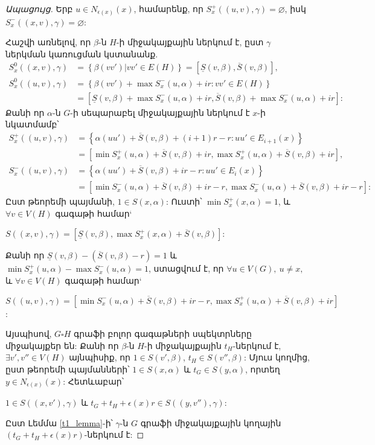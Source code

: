 \begin{proof}[Ապացույց]
Երբ $u\in N_{\epsilon(x)}(x)$, համարենք, որ $S_x^+((u,v),\gamma)=\varnothing$, իսկ $S_x^-((x,v),\gamma)=\varnothing$:

Հաշվի առնելով, որ $\beta$-ն $H$-ի միջակայքային ներկում է, ըստ $\gamma$ ներկման կառուցման կստանանք.
\begin{align*}
S_x^0((x,v),\gamma) &= \left\{ \beta(vv') | vv'\in E(H) \right\} = [\underline{S}(v,\beta),\overline{S}(v,\beta)],\\
S_x^0((u,v),\gamma) &= \left\{ \beta(vv') + \max{S_x^-(u,\alpha)} + i r : vv'\in E(H) \right\}\\
					&= [\underline{S}(v,\beta) + \max{S_x^-(u,\alpha)} + i r ,\overline{S}(v,\beta) + \max{S_x^-(u,\alpha)} + i r ]:
\end{align*}
Քանի որ $\alpha$-ն $G$-ի սեպարաբել միջակայքային ներկում է $x$-ի նկատմամբ՝
\begin{align*}
S_x^+((u,v),\gamma) &= \left\{ \alpha(uu') + \overline{S}(v,\beta) + (i+1)r - r : uu'\in E_{i+1}(x) \right\}\\
					&= [\min{S_x^+(u,\alpha)} + \overline{S}(v,\beta) + i r,\max{S_x^+(u,\alpha)} + \overline{S}(v,\beta) + i r ],\\
S_x^-((u,v),\gamma) &= \left\{ \alpha(uu') + \overline{S}(v,\beta) + i r - r : uu'\in E_{i}(x) \right\}\\
					&= [\min{S_x^-(u,\alpha)} + \overline{S}(v,\beta) + i r - r,\max{S_x^-(u,\alpha)} + \overline{S}(v,\beta) + i r - r ]:
\end{align*}
Ըստ թեորեմի պայմանի, $1 \in S(x,\alpha)$: Ուստի՝ $\min{S_x^+(x,\alpha)}=1$, և $\forall v \in V(H)$ գագաթի համար`
\begin{center}
$S((x,v),\gamma) = [\underline{S}(v,\beta),\max{S_x^+(x,\alpha)} + \overline{S}(v,\beta)]$:
\end{center}
Քանի որ $ \underline{S}(v,\beta) - (\overline{S}(v,\beta) - r) = 1 $ և $ \min{S_x^+(u,\alpha)} - \max{S_x^-(u,\alpha)} = 1$, ստացվում է, որ $\forall u \in V(G),\ u \not= x,$ և $\forall v \in V(H)$ գագաթի համար`
\begin{center}
$S((u,v),\gamma) = [\min{S_x^-(u,\alpha)} + \overline{S}(v,\beta) + i r - r,\max{S_x^+(u,\alpha)} + \overline{S}(v,\beta) + i r] $:
\end{center}
Այսպիսով, $G\square H$ գրաֆի բոլոր գագաթների սպեկտրները միջակայքեր են: Քանի որ $\beta$-ն $H$-ի միջակայքային $t_H$-ներկում է, $\exists v',v'' \in V(H)$ այնպիսիք, որ $1 \in S(v',\beta)$, $t_H \in S(v'',\beta)$: Մյուս կողմից, ըստ թեորեմի պայմանների՝ $1 \in S(x,\alpha)$ և $t_G \in S(y,\alpha)$, որտեղ $y \in N_{\epsilon(x)}(x)$: Հետևաբար՝
\begin{center}
$1 \in S((x,v'),\gamma)$ և $t_G+t_H+\epsilon(x)r \in S((y,v''),\gamma)$:
\end{center}
Ըստ Լեմմա \ref{t1_lemma}-ի՝ $\gamma$-ն $G$ գրաֆի միջակայքային կողային $(t_G+t_H+\epsilon(x)r)$-ներկում է:

\end{proof}

